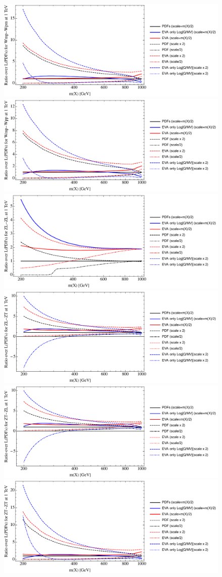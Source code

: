 \documentclass[a4paper,11pt]{article}
\begin{document}
\begin{figure}[ht]
\includegraphics[width=0.46\linewidth]{PlotLumi/1TeV/ratios/Wmp-Wpm.pdf}
\includegraphics[width=0.46\linewidth]{PlotLumi/1TeV/ratios/Wmp-Wpp.pdf}
\includegraphics[width=0.46\linewidth]{PlotLumi/1TeV/ratios/ZL-ZL.pdf}
\includegraphics[width=0.46\linewidth]{PlotLumi/1TeV/ratios/ZL-ZT.pdf}
\includegraphics[width=0.46\linewidth]{PlotLumi/1TeV/ratios/ZT-ZL.pdf}
\includegraphics[width=0.46\linewidth]{PlotLumi/1TeV/ratios/ZT-ZT.pdf}
\end{figure}
\end{document}
